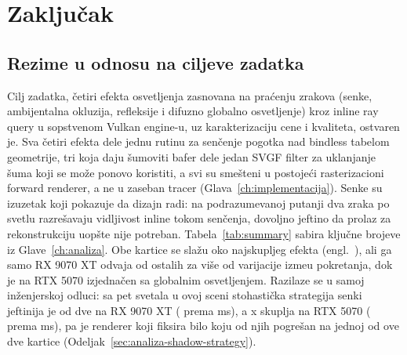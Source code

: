 \chapter{Zaklju\v{c}ak}
\label{ch:zakljucak}


\section{Rezime u odnosu na ciljeve zadatka}

Cilj zadatka, \v{c}etiri efekta osvetljenja zasnovana na pra\'cenju zrakova (senke, ambijentalna
okluzija, refleksije i difuzno globalno osvetljenje) kroz inline ray query u sopstvenom Vulkan
engine-u, uz karakterizaciju cene i kvaliteta, ostvaren je. Sva \v{c}etiri efekta dele jednu rutinu
za sen\v{c}enje pogotka nad bindless tabelom geometrije, tri koja daju \v{s}umoviti bafer dele jedan
SVGF filter za uklanjanje \v{s}uma koji se mo\v{z}e ponovo koristiti, a svi su sme\v{s}teni u postoje\'ci
rasterizacioni forward renderer, a ne u zaseban tracer (Glava~\ref{ch:implementacija}). Senke su
izuzetak koji pokazuje da dizajn radi: na podrazumevanoj putanji dva zraka po svetlu razre\v{s}avaju
vidljivost inline tokom sen\v{c}enja, dovoljno jeftino da prolaz za rekonstrukciju uop\v{s}te nije
potreban. Tabela~\ref{tab:summary} sabira klju\v{c}ne brojeve iz Glave~\ref{ch:analiza}. Obe kartice se sla\v{z}u oko najskupljeg efekta (engl.\ \perfTopEffectAMDEn{}), ali ga samo RX 9070 XT
odvaja od ostalih za vi\v{s}e od varijacije izme\dj u pokretanja, dok je na RTX 5070 izjedna\v{c}en
sa globalnim osvetljenjem. Razilaze se u samoj in\v{z}enjerskoj odluci: sa pet svetala u ovoj sceni stohasti\v{c}ka
strategija senki jeftinija je od dve na RX 9070 XT (\perfShadowStochAMD{} prema
\perfShadowInlineAMD{} ms), a \perfShadowRatioNV{}x skuplja na RTX 5070 (\perfShadowStochNV{} prema
\perfShadowInlineNV{} ms), pa je renderer koji fiksira bilo koju od njih pogre\v{s}an na jednoj od ove
dve kartice (Odeljak~\ref{sec:analiza-shadow-strategy}).

